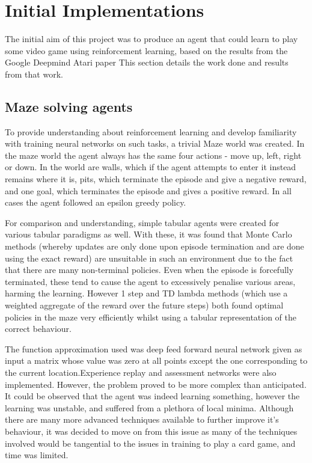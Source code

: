 \section{Initial Implementations}
The initial aim of this project was to produce an agent that could learn to play some video game using reinforcement learning, based on the results from the Google Deepmind Atari paper \cite{atariDQN} %
This section details the work done and results from that work.
\subsection{Maze solving agents}
To provide understanding about reinforcement learning and develop familiarity with training neural networks on such tasks, a trivial Maze world was created. In the maze world the agent always has the same four actions - move up, left, right or down. In the world are walls, which if the agent attempts to enter it instead remains where it is, pits, which terminate the episode and give a negative reward, and one goal, which terminates the episode and gives a positive reward.
In all cases the agent followed an epsilon greedy policy. %

For comparison and understanding, simple tabular agents were created for various tabular paradigms as well. With these, it was found that Monte Carlo methods (whereby updates are only done upon episode termination and are done using the exact reward) are unsuitable in such an environment due to the fact that there are many non-terminal policies. Even when the episode is forcefully terminated, these tend to cause the agent to excessively penalise various areas, harming the learning. However 1 step and TD lambda methods (which use a weighted aggregate of the reward over the future steps) both found optimal policies in the maze very efficiently whilst using a tabular representation of the correct behaviour.

The function approximation used was deep feed forward neural network given as input a matrix whose value was zero at all points except the one corresponding to the current location.Experience replay and assessment networks were also implemented. However, the problem proved to be more complex than anticipated. It could be observed that the agent was indeed learning something, however the learning was unstable, and suffered from a plethora of local minima. Although there are many more advanced techniques available to further improve it's behaviour, it was decided to move on from this issue as many of the techniques involved would be tangential to the issues in training to play a card game, and time was limited.
